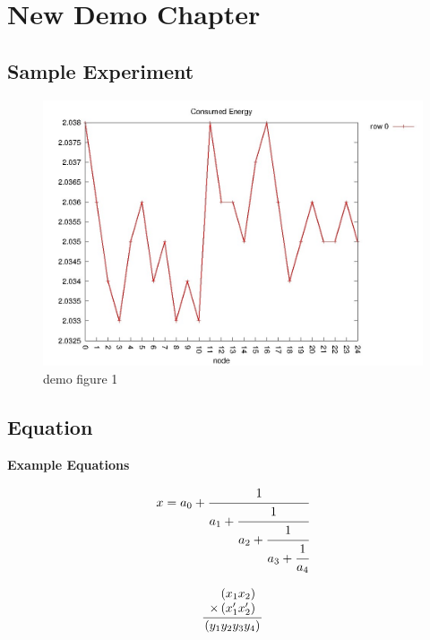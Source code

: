 
\chapter{New Demo Chapter}

\section{Sample Experiment}

				\begin{figure}[h!]
					\centering
					\begin{minipage}[b]{0.80\linewidth}
               \includegraphics[scale=0.6]{demo1}
                \caption{demo figure 1}						
                \label{fig:demo1}
                \end{minipage}
                \end{figure}
                
                
     \newpage
    
 \section{Equation}    
  
  
{\bf Example Equations \cite{k3} }  
     
     \begin{equation}
  \label{eq:Continued_fractions}
  x = a_0 + \cfrac{1}{a_1
          + \cfrac{1}{a_2
          + \cfrac{1}{a_3 + \cfrac{1}{a_4} } } }
\end{equation}


\begin{equation}
  \label{eq:Multiplication}
\frac{
    \begin{array}[b]{r}
      \left( x_1 x_2 \right)\\
      \times \left( x'_1 x'_2 \right)
    \end{array}
  }{
    \left( y_1y_2y_3y_4 \right)
  }
\end{equation}


